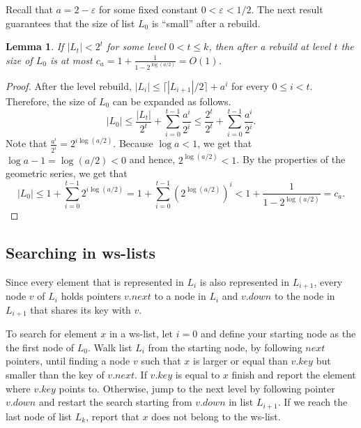 \documentclass[11pt]{article}       %
\newtheorem{lemma}{Lemma}
\newcommand{\wlist}{ws-list\xspace}
\newcommand{\wlists}{ws-lists\xspace}
\begin{document}

Recall that $a = 2-\varepsilon$ for some fixed constant $0<\varepsilon < 1/2$. The next result guarantees that the size of list $L_0$ is ``small'' after a rebuild.

\begin{lemma}\label{lemma:Size at level zero}
If $|L_t| < 2^t$ for some level $0< t\leq k$, then after a rebuild at level $t$ the size of $L_0$ is at most $c_a = 1 +\frac{1}{1-2^{\log (a/2)}}= O(1)$.
\end{lemma}
\begin{proof}
After the level rebuild, $|L_i| \leq \lceil |L_{i+1}|/2 \rceil + a^i$ for every $0\leq i< t$. Therefore, the size of $L_0$ can be expanded as follows.
$$|L_0| \leq \frac{|L_t|}{2^t} + \sum_{i=0}^{t-1} \frac{a^i}{2^i}\leq \frac{2^t}{2^t} + \sum_{i=0}^{t-1} \frac{a^i}{2^i}.$$
Note that $\frac{a^i}{2^i} = 2^{i \log (a/2) }$. Because $\log a <1$, we get that $\log a -1 = \log (a/2) < 0$ and hence, $2^{\log (a/2)} <1$. By the properties of the geometric series, we get that
$$|L_0| \leq 1 + \sum_{i=0}^{t-1} 2^{i \log (a /2)} = 1 + \sum_{i=0}^{t-1} (2^{\log (a/2)})^i < 1 +\frac{1}{1-2^{\log (a/2)}} = c_a.$$
\end{proof}


\subsection{Searching in \wlists}

Since every element that is represented in $L_i$ is also represented in $L_{i+1}$, every node $v$ of $L_i$ holds pointers $v.next$ to a node in $L_i$ and $v.down$ to the node in $L_{i+1}$ that shares its key with $v$.

To search for element $x$ in a \wlist, let $i = 0$ and define your starting node as the the first node of $L_0$.
Walk list $L_i$ from the starting node, by following $next$ pointers, until finding a node $v$ such that $x$ is larger or equal than $v.key$ but smaller than the key of $v.next$. If $v.key$ is equal to $x$ finish and report the element where $v.key$ points to.
Otherwise, jump to the next level by following pointer $v.down$ and restart the search starting from $v.down$ in list $L_{i+1}$.
If we reach the last node of list $L_k$, report that $x$ does not belong to the \wlist.
\end{document}
